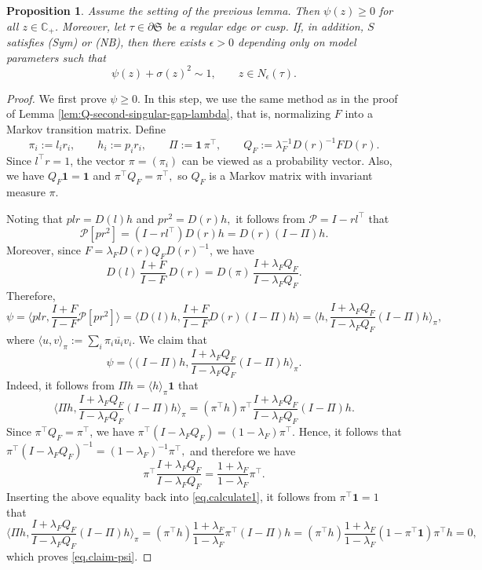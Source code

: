 \documentclass[11pt,twoside, a4paper]{article}
\numberwithin{equation}{section}
\numberwithin{figure}{section}
\theoremstyle{plain} %
\newtheorem{proposition}[theorem]{Proposition}
\theoremstyle{definition}
\theoremstyle{remark}
\newcommand{\1} {\mspace{1 mu}}
\newcommand{\2} {\mspace{2 mu}}
\newcommand{\Cp} {\mathbb {C}_+}
\begin{document}
\begin{proposition}\label{prop:psi-positive-and-nondegenerate}
Assume the setting of the previous lemma. Then
$
\psi(z)\ge0
$
for all $z\in\Cp$.
Moreover, let \(\tau\in \partial\mathfrak S\) be a regular edge or cusp.
If, in addition, $S$ satisfies \textup{(Sym)} or \textup{(NB)}, then there exists $\epsilon>0$ depending only on model parameters such that
\begin{equation*}
    \psi(z)+\sigma(z)^2\sim 1,\qquad z\in N_\epsilon(\tau).
\end{equation*}
\end{proposition}

\begin{proof}
  We first prove $\psi\ge 0$.
  In this step, we use the same method as in the proof of Lemma \ref{lem:Q-second-singular-gap-lambda}, that is, normalizing $F$ into a Markov transition matrix.
  Define
  \[
  \pi_i:=l_ir_i,\qquad
  h_i:=p_ir_i,\qquad \Pi:=\mathbf 1\,\pi^\top,
  \qquad
  Q_F:=\lambda_F^{-1}D(r)^{-1}FD(r).
  \]
  Since \(l^\top r=1\), the vector \(\pi=(\pi_i)\) can be viewed as a probability vector. Also, we have
  $
  Q_F\mathbf 1=\mathbf 1$ and
  $
  \pi^\top Q_F=\pi^\top,
  $
  so \(Q_F\) is a Markov matrix with invariant measure \(\pi\).

  Noting that
  $
  plr=D(l)h
  $
  and
  $
  pr^2=D(r)h,
  $
  it follows from \(\mathcal{P}=I-r l^\top\) that
  \[
  \mathcal{P}[pr^2]
  =
  (I-r l^\top)D(r)h
  =
  D(r)(I-\Pi)h.
  \]
  Moreover, since \(F=\lambda_F D(r)Q_FD(r)^{-1}\), we have
  \[
  D(l)\,\frac{I+F}{I-F}\,D(r)
  =
  D(\pi)\,\frac{I+\lambda_F Q_F}{I-\lambda_F Q_F}.
  \]
  Therefore,
  \[
  \psi
  =
  \Big\langle plr,\frac{I+F}{I-F}\mathcal{P}[pr^2]\Big\rangle
  =
  \Big\langle D(l)h,\frac{I+F}{I-F}D(r)(I-\Pi)h\Big\rangle
  =
  \Big\langle h,\frac{I+\lambda_F Q_F}{I-\lambda_F Q_F}(I-\Pi)h\Big\rangle_\pi,
  \]
  where
  $
  \langle u,v\rangle_\pi:=\sum_i \pi_i \overline{u_i} v_i.
  $ 
  We claim that 
  \begin{equation}\label{eq.claim-psi}
    \psi=\Big\langle (I-\Pi)h,\frac{I+\lambda_F Q_F}{I-\lambda_F Q_F}(I-\Pi)h\Big\rangle_\pi.
  \end{equation}
  Indeed, it follows from $\Pi h=\langle h\rangle_\pi\mathbf{1}$ that
  \begin{equation}\label{eq.calculate1}
    \Big\langle \Pi h,\frac{I+\lambda_F Q_F}{I-\lambda_F Q_F}(I-\Pi)h\Big\rangle_\pi=(\pi^\top h)\pi^\top\frac{I+\lambda_F Q_F}{I-\lambda_F Q_F}(I-\Pi)h.
  \end{equation}
  Since \(\pi^\top Q_F=\pi^\top\), we have
  $
    \pi^\top(I-\lambda_F Q_F)
    =
    (1-\lambda_F)\pi^\top .
  $
  Hence, it follows that
  $
    \pi^\top(I-\lambda_F Q_F)^{-1}
    =
    (1-\lambda_F)^{-1}\pi^\top,
  $
  and therefore we have
  \[
    \pi^\top\frac{I+\lambda_F Q_F}{I-\lambda_F Q_F}
    =
    \frac{1+\lambda_F}{1-\lambda_F}\pi^\top .
  \]
  Inserting the above equality back into \eqref{eq.calculate1}, it follows from $\pi^\top\mathbf{1}= 1$ that
  \[
  \Big\langle \Pi h,\frac{I+\lambda_F Q_F}{I-\lambda_F Q_F}(I-\Pi)h\Big\rangle_\pi=(\pi^\top h)\frac{1+\lambda_F}{1-\lambda_F}\pi^\top(I-\Pi)h=(\pi^\top h)\frac{1+\lambda_F}{1-\lambda_F}(1-\pi^\top\mathbf{1})\pi^\top h=0,
  \]
  which proves \eqref{eq.claim-psi}.


\end{proof}
\end{document}
